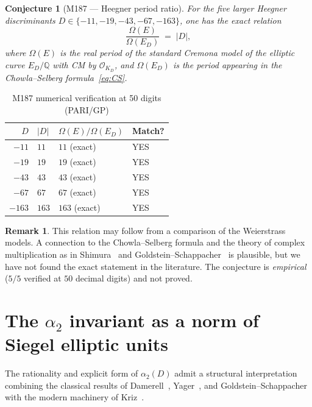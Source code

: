 \documentclass[12pt]{amsart}
\newtheorem{conjecture}[theorem]{Conjecture}
\theoremstyle{definition}
\newtheorem{remark}[theorem]{Remark}
\newcommand{\Q}{\mathbb{Q}}
\newcommand{\OK}{\mathcal{O}_K}
\newcommand{\Omega}{\varOmega}
\begin{document}
\begin{conjecture}[M187 --- Heegner period ratio]
  \label{conj:M187}
  For the five larger Heegner discriminants
  $D \in \{-11, -19, -43, -67, -163\}$, one has the exact relation
  \[
    \frac{\Omega(E)}{\Omega(E_D)} \;=\; |D|,
  \]
  where $\Omega(E)$ is the real period of the standard Cremona model of
  the elliptic curve $E_D / \Q$ with CM by $\OK_D$, and $\Omega(E_D)$ is
  the period appearing in the Chowla--Selberg formula~\eqref{eq:CS}.
\end{conjecture}

\begin{table}[h]
  \caption{M187 numerical verification at 50 digits (PARI/GP)}
  \label{tab:M187}
  \renewcommand{\arraystretch}{1.25}
  \begin{tabular}{rlll}
    \toprule
    $D$ & $|D|$ & $\Omega(E)/\Omega(E_D)$ & Match? \\
    \midrule
    $-11$  & $11$  & $11$ (exact) & YES \\
    $-19$  & $19$  & $19$ (exact) & YES \\
    $-43$  & $43$  & $43$ (exact) & YES \\
    $-67$  & $67$  & $67$ (exact) & YES \\
    $-163$ & $163$ & $163$ (exact) & YES \\
    \bottomrule
  \end{tabular}
\end{table}

\begin{remark}
  This relation may follow from a comparison of the Weierstrass models.
  A connection to the Chowla--Selberg formula and the theory of complex
  multiplication as in Shimura~\cite{CITE-NEEDED-Shimura1971} and
  Goldstein--Schappacher~\cite{GoldsteinSchappacher1981} is plausible,
  but we have not found the exact statement in the literature.
  The conjecture is \emph{empirical} ($5/5$ verified at $50$ decimal digits)
  and not proved.
\end{remark}

\section{The $\alpha_2$ invariant as a norm of Siegel elliptic units}
\label{sec:siegel}

The rationality and explicit form of $\alpha_2(D)$ admit a structural
interpretation combining the classical results of Damerell~\cite{Damerell1971},
Yager~\cite{Yager1982}, and Goldstein--Schappacher~\cite{GoldsteinSchappacher1981}
with the modern machinery of Kriz~\cite{Kriz2018}.
\end{document}
